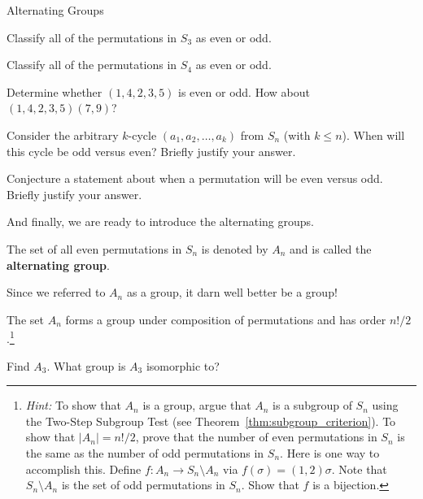 \begin{section}{Alternating Groups}
\begin{problem}
Classify all of the permutations in $S_3$ as even or odd.
\end{problem}

\begin{problem}
Classify all of the permutations in $S_4$ as even or odd.
\end{problem}

\begin{problem}
Determine whether $(1,4,2,3,5)$ is even or odd.  How about $(1,4,2,3,5)(7,9)$?
\end{problem}

\begin{problem}
Consider the arbitrary $k$-cycle $(a_1,a_2,\ldots, a_k)$ from $S_n$ (with $k\leq n$).  When will this cycle be odd versus even?  Briefly justify your answer. 
\end{problem}

\begin{problem}
Conjecture a statement about when a permutation will be even versus odd.  Briefly justify your answer.
\end{problem}

And finally, we are ready to introduce the alternating groups.

\begin{definition}
The set of all even permutations in $S_n$ is denoted by $A_n$ and is called the \textbf{alternating group}.
\end{definition}

Since we referred to $A_n$ as a group, it darn well better be a group!

\begin{theorem}
The set $A_n$ forms a group under composition of permutations and has order $n!/2$.\footnote{\emph{Hint:} To show that $A_n$ is a group, argue that $A_n$ is a subgroup of $S_n$ using the Two-Step Subgroup Test (see Theorem~\ref{thm:subgroup_criterion}). To show that $|A_n|=n!/2$, prove that the number of even permutations in $S_n$ is the same as the number of odd permutations in $S_n$.  Here is one way to accomplish this. Define $f:A_n\to S_n\setminus A_n$ via $f(\sigma)=(1,2)\sigma$.  Note that $S_n\setminus A_n$ is the set of odd permutations in $S_n$. Show that $f$ is a bijection.}
\end{theorem}

\begin{problem}
Find $A_3$.  What group is $A_3$ isomorphic to?
\end{problem}


\end{section}
